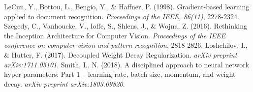 \documentclass[UTF8]{ctexart}
\begin{document}
\begin{thebibliography}{9}
     LeCun, Y., Bottou, L., Bengio, Y., \& Haffner, P. (1998). Gradient-based learning applied to document recognition. \textit{Proceedings of the IEEE, 86(11)}, 2278-2324.
     Szegedy, C., Vanhoucke, V., Ioffe, S., Shlens, J., \& Wojna, Z. (2016). Rethinking the Inception Architecture for Computer Vision. \textit{Proceedings of the IEEE conference on computer vision and pattern recognition}, 2818-2826.
     Loshchilov, I., \& Hutter, F. (2017). Decoupled Weight Decay Regularization. \textit{arXiv preprint arXiv:1711.05101}.
     Smith, L. N. (2018). A disciplined approach to neural network hyper-parameters: Part 1 -- learning rate, batch size, momentum, and weight decay. \textit{arXiv preprint arXiv:1803.09820}.
\end{thebibliography}
\end{document}
